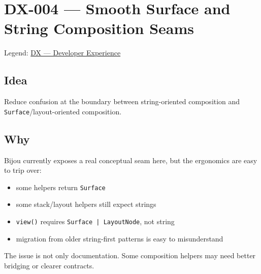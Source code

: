 \chapter{DX-004 --- Smooth Surface and String Composition Seams}\label{record-303}

\smallskip

Legend: \href{https://github.com/flyingrobots/bijou/blob/cbd70612140e7a450d764b3c7be1c6af878b99bc/docs/method/graveyard/legends/DX-developer-experience.md}{DX --- Developer Experience}

\section{Idea}\label{record-303-idea}

Reduce confusion at the boundary between string-oriented composition and \texttt{S\allowbreak{}u\allowbreak{}r\allowbreak{}f\allowbreak{}a\allowbreak{}c\allowbreak{}e}/layout-oriented composition.

\section{Why}\label{record-303-why}

Bijou currently exposes a real conceptual seam here, but the ergonomics are easy to trip over:

\begin{itemize}
\tightlist
\item
  some helpers return \texttt{S\allowbreak{}u\allowbreak{}r\allowbreak{}f\allowbreak{}a\allowbreak{}c\allowbreak{}e}
\item
  some stack/layout helpers still expect strings
\item
  \texttt{v\allowbreak{}i\allowbreak{}e\allowbreak{}w\allowbreak{}(\allowbreak{})} requires \texttt{S\allowbreak{}u\allowbreak{}r\allowbreak{}f\allowbreak{}a\allowbreak{}c\allowbreak{}e\allowbreak{} \allowbreak{}|\allowbreak{} \allowbreak{}L\allowbreak{}a\allowbreak{}y\allowbreak{}o\allowbreak{}u\allowbreak{}t\allowbreak{}N\allowbreak{}o\allowbreak{}d\allowbreak{}e}, not string
\item
  migration from older string-first patterns is easy to misunderstand
\end{itemize}

The issue is not only documentation. Some composition helpers may need better bridging or clearer contracts.

